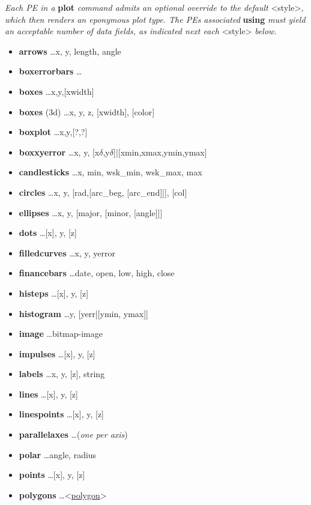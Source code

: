 \textit{Each PE in a }\textbf{plot}\textit{ command admits an optional override to the default }<style>\textit{, which then renders an eponymous plot type. The PE\textquotesingle s associated }\textbf{using}\textit{ must yield an acceptable number of data fields, as indicated next each }<style>\textit{ below.}
{\footnotesize
\begin{itemize}
    \item \textbf{arrows} \dots x, y, length, angle
    \item \textbf{boxerrorbars} \dots 
    \item \textbf{boxes} \dots x,y,[xwidth]
    \item \textbf{boxes} (3d) \dots x, y, z, [xwidth], [color]
    \item \textbf{boxplot} \dots x,y,[?,?]
    \item \textbf{boxxyerror} \dots x, y, [x$\delta$,y$\delta$]|[xmin,xmax,ymin,ymax]
    \item \textbf{candlesticks} \dots x, min, wsk\_min, wsk\_max, max
    \item \textbf{circles} \dots x, y, [rad,[arc\_beg, [arc\_end]]], [col]
    \item \textbf{ellipses} \dots x, y, [major, [minor, [angle]]]
    \item \textbf{dots} \dots [x], y, [z]
    \item \textbf{filledcurves} \dots x, y, yerror
    \item \textbf{financebars} \dots date, open, low, high, close
    \item \textbf{histeps} \dots [x], y, [z]
    \item \textbf{histogram} \dots y, [yerr|[ymin, ymax]] 
    \item \textbf{image} \dots bitmap-image 
    \item \textbf{impulses} \dots [x], y, [z] 
    \item \textbf{labels} \dots x, y, [z], string 
    \item \textbf{lines} \dots [x], y, [z]
    \item \textbf{linespoints} \dots [x], y, [z]
    \item \textbf{parallelaxes} \dots (\textit{one per axis}) 
    \item \textbf{polar}  \dots angle, radius 
    \item \textbf{points} \dots [x], y, [z]
    \item \textbf{polygons} \dots <\href{http://gnuplot.sourceforge.net/demo\_5.5/polygons.html}{polygon}>

\end{itemize}}
